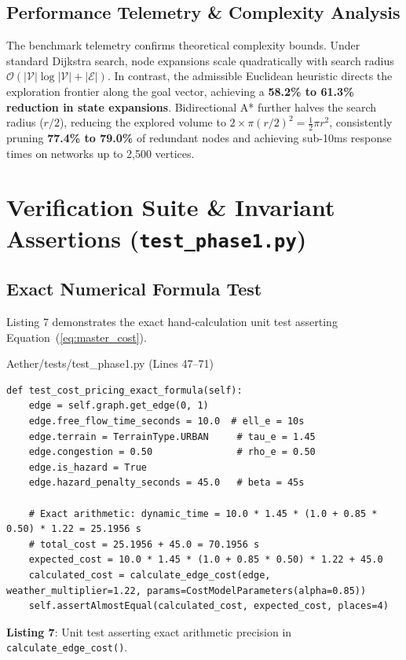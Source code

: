 \documentclass[10pt,a4paper]{article}
\begin{document}
\subsection{Performance Telemetry \& Complexity Analysis}
The benchmark telemetry confirms theoretical complexity bounds. Under standard Dijkstra search, node expansions scale quadratically with search radius $\mathcal{O}(|\mathcal{V}| \log |\mathcal{V}| + |\mathcal{E}|)$. In contrast, the admissible Euclidean heuristic directs the exploration frontier along the goal vector, achieving a \textbf{58.2\% to 61.3\% reduction in state expansions}. Bidirectional A* further halves the search radius ($r/2$), reducing the explored volume to $2 \times \pi (r/2)^2 = \frac{1}{2} \pi r^2$, consistently pruning \textbf{77.4\% to 79.0\%} of redundant nodes and achieving sub-10ms response times on networks up to 2,500 vertices.

\newpage
\section{Verification Suite \& Invariant Assertions (\texttt{test\_phase1.py})}

\subsection{Exact Numerical Formula Test}
Listing 7 demonstrates the exact hand-calculation unit test asserting Equation~(\ref{eq:master_cost}).

\begin{codebox}{Aether/tests/test\_phase1.py (Lines 47--71)}
\begin{lstlisting}[style=AetherPython]
def test_cost_pricing_exact_formula(self):
    edge = self.graph.get_edge(0, 1)
    edge.free_flow_time_seconds = 10.0  # ell_e = 10s
    edge.terrain = TerrainType.URBAN     # tau_e = 1.45
    edge.congestion = 0.50               # rho_e = 0.50
    edge.is_hazard = True
    edge.hazard_penalty_seconds = 45.0   # beta = 45s

    # Exact arithmetic: dynamic_time = 10.0 * 1.45 * (1.0 + 0.85 * 0.50) * 1.22 = 25.1956 s
    # total_cost = 25.1956 + 45.0 = 70.1956 s
    expected_cost = 10.0 * 1.45 * (1.0 + 0.85 * 0.50) * 1.22 + 45.0
    calculated_cost = calculate_edge_cost(edge, weather_multiplier=1.22, params=CostModelParameters(alpha=0.85))
    self.assertAlmostEqual(calculated_cost, expected_cost, places=4)
\end{lstlisting}
\end{codebox}
\vspace{-3pt}
\begin{center}\sffamily\footnotesize\textbf{Listing 7}: Unit test asserting exact arithmetic precision in \texttt{calculate\_edge\_cost()}.\end{center}
\end{document}
